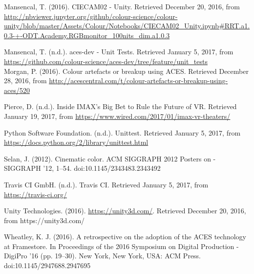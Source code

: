 \documentclass[conference]{IEEEtran}
\begin{document}
\begin{thebibliography}{1}
\renewcommand\@biblabel[1]{[MaB16]}
\bibitem{}
Mansencal, T. (2016). CIECAM02 - Unity. Retrieved December 20, 2016, from \url{http://nbviewer.jupyter.org/github/colour-science/colour-unity/blob/master/Assets/Colour/Notebooks/CIECAM02_Unity.ipynb#RRT.a1.0.3-+-ODT.Academy.RGBmonitor_100nits_dim.a1.0.3} \vspace{2mm}

\renewcommand\@biblabel[1]{[Man17]}
\bibitem{}
Mansencal, T. (n.d.). aces-dev - Unit Tests. Retrieved January 5, 2017, from \url{https://github.com/colour-science/aces-dev/tree/feature/unit_tests}\\

\renewcommand\@biblabel[1]{[Mor16]}
\bibitem{}
Morgan, P. (2016). Colour artefacts or breakup using ACES. Retrieved December 28, 2016, from \url{http://acescentral.com/t/colour-artefacts-or-breakup-using-aces/520} \vspace{2mm}

\renewcommand\@biblabel[1]{[Pie20]}
\bibitem{}
Pierce, D. (n.d.). Inside IMAX’s Big Bet to Rule the Future of VR. Retrieved January 19, 2017, from \url{https://www.wired.com/2017/01/imax-vr-theaters/} \vspace{2mm}

\renewcommand\@biblabel[1]{[Pyt17]}
\bibitem{}
Python Software Foundation. (n.d.). Unittest. Retrieved January 5, 2017, from \url{https://docs.python.org/2/library/unittest.html} \vspace{2mm}

\renewcommand\@biblabel[1]{[Sel12]}
\bibitem{}
Selan, J. (2012). Cinematic color. ACM SIGGRAPH 2012 Posters on - SIGGRAPH ’12, 1–54. doi:10.1145/2343483.2343492 \vspace{2mm}

\renewcommand\@biblabel[1]{[Trav17]}
\bibitem{}
Travis CI GmbH. (n.d.). Travis CI. Retrieved January 5, 2017, from \url{https://travis-ci.org/} \vspace{2mm}

\renewcommand\@biblabel[1]{[Uni16]}
\bibitem{}
Unity Technologies. (2016). \url{https://unity3d.com/}. Retrieved December 20, 2016, from {https://unity3d.com/} \vspace{2mm}

\renewcommand\@biblabel[1]{[Whe16]}
\bibitem{}
Wheatley, K. J. (2016). A retrospective on the adoption of the ACES technology at Framestore. In Proceedings of the 2016 Symposium on Digital Production - DigiPro ’16 (pp. 19–30). New York, New York, USA: ACM Press. doi:10.1145/2947688.2947695 \vspace{2mm}

\end{thebibliography}
\end{document}
